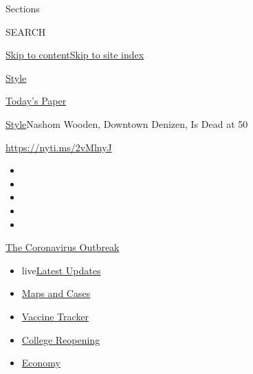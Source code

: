 Sections

SEARCH

\protect\hyperlink{site-content}{Skip to
content}\protect\hyperlink{site-index}{Skip to site index}

\href{https://www.nytimes3xbfgragh.onion/section/style}{Style}

\href{https://myaccount.nytimes3xbfgragh.onion/auth/login?response_type=cookie\&client_id=vi}{}

\href{https://www.nytimes3xbfgragh.onion/section/todayspaper}{Today's
Paper}

\href{/section/style}{Style}\textbar{}Nashom Wooden, Downtown Denizen,
Is Dead at 50

\url{https://nyti.ms/2vMlnyJ}

\begin{itemize}
\item
\item
\item
\item
\item
\end{itemize}

\href{https://www.nytimes3xbfgragh.onion/news-event/coronavirus?action=click\&pgtype=Article\&state=default\&region=TOP_BANNER\&context=storylines_menu}{The
Coronavirus Outbreak}

\begin{itemize}
\tightlist
\item
  live\href{https://www.nytimes3xbfgragh.onion/2020/08/04/world/coronavirus-covid-19.html?action=click\&pgtype=Article\&state=default\&region=TOP_BANNER\&context=storylines_menu}{Latest
  Updates}
\item
  \href{https://www.nytimes3xbfgragh.onion/interactive/2020/us/coronavirus-us-cases.html?action=click\&pgtype=Article\&state=default\&region=TOP_BANNER\&context=storylines_menu}{Maps
  and Cases}
\item
  \href{https://www.nytimes3xbfgragh.onion/interactive/2020/science/coronavirus-vaccine-tracker.html?action=click\&pgtype=Article\&state=default\&region=TOP_BANNER\&context=storylines_menu}{Vaccine
  Tracker}
\item
  \href{https://www.nytimes3xbfgragh.onion/2020/08/02/us/covid-college-reopening.html?action=click\&pgtype=Article\&state=default\&region=TOP_BANNER\&context=storylines_menu}{College
  Reopening}
\item
  \href{https://www.nytimes3xbfgragh.onion/live/2020/08/03/business/stock-market-today-coronavirus?action=click\&pgtype=Article\&state=default\&region=TOP_BANNER\&context=storylines_menu}{Economy}
\end{itemize}


